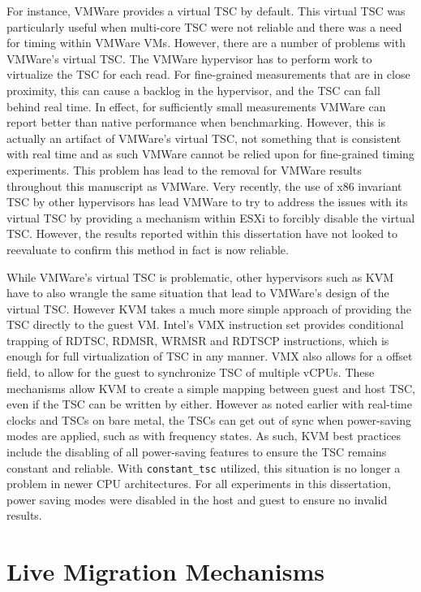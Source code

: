 For instance, VMWare provides a virtual TSC by default. This virtual TSC was particularly useful when multi-core TSC were not reliable and there was a need for timing within VMWare VMs. However, there are a number of problems with VMWare's virtual TSC. The VMWare hypervisor has to perform work to virtualize the TSC for each read.  For fine-grained measurements that are in close proximity, this can cause a backlog in the hypervisor, and the TSC can fall behind real time. In effect, for sufficiently small measurements VMWare can report better than native performance when benchmarking.  However, this is actually an artifact of VMWare's virtual TSC, not something that is consistent with real time and as such VMWare cannot be relied upon for fine-grained timing experiments. This problem has lead to the removal for VMWare results throughout this manuscript as VMWare. Very recently, the use of x86 invariant TSC by other hypervisors has lead VMWare to try to address the issues with its virtual TSC by providing a mechanism within ESXi to forcibly disable the virtual TSC.  However, the results reported within this dissertation have not looked to reevaluate to confirm this method in fact is now reliable. 

While VMWare's virtual TSC is problematic, other hypervisors such as KVM have to also wrangle the same situation that lead to VMWare's design of the virtual TSC. However KVM takes a much more simple approach of providing the TSC directly to the guest VM. Intel's VMX instruction set provides conditional trapping of RDTSC, RDMSR, WRMSR and RDTSCP instructions, which is enough for full virtualization of TSC in any manner. VMX also allows for a offset field, to allow for the guest to synchronize TSC of multiple vCPUs. These mechanisms allow KVM to create a simple mapping between guest and host TSC, even if the TSC can be written by either.  However as noted earlier with real-time clocks and TSCs on bare metal, the TSCs can get out of sync when power-saving modes are applied, such as with frequency states. As such, KVM best practices include the disabling of all power-saving features to ensure the TSC remains constant and reliable.  With \verb|constant_tsc| utilized, this situation is no longer a problem in newer CPU architectures. For all experiments in this dissertation, power saving modes were disabled in the host and guest to ensure no invalid results.  



\section{Live Migration Mechanisms}

